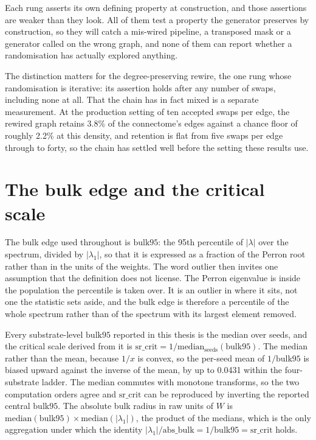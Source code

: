Each rung asserts its own defining property at construction, and those
assertions are weaker than they look. All of them test a property the generator
preserves by construction, %
so they will catch a mis-wired pipeline, a transposed mask or a generator called
on the wrong graph, and none of them can report whether a randomisation has
actually explored anything.

The distinction matters for the degree-preserving rewire, the one rung whose
randomisation is iterative: its assertion holds after any number of swaps,
including none at all. That the chain has in fact mixed is a separate
measurement. At the production setting of ten accepted swaps per edge, the
rewired graph retains 3.8\% %
of the connectome's edges against a chance floor of roughly
2.2\% %
at this density, and retention is flat from five swaps per edge through to
forty, %
so the chain has settled well before the setting these results use.



\section{The bulk edge and the critical scale}
\label{sec:methods-bulk95}
\bigskip

The bulk edge used throughout is $\mathrm{bulk95}$: the 95th percentile of
$|\lambda|$ over the spectrum, divided by $|\lambda_1|$, so that it is expressed
as a fraction of the Perron root rather than in the units of the
weights. %
The word outlier then invites one assumption that the definition does not
license. The Perron eigenvalue is inside the population the percentile is taken
over. %
It is an outlier in where it sits, not one the statistic sets aside, and the
bulk edge is therefore a percentile of the whole spectrum rather than of the
spectrum with its largest element removed.

Every substrate-level $\mathrm{bulk95}$ reported in this thesis is the median
over seeds, and the critical scale derived from it is
$\mathrm{sr\_crit} = 1 / \mathrm{median}_{\text{seeds}}(\mathrm{bulk95})$. %
The median rather than the mean, because $1/x$ is convex, so the per-seed mean
of $1/\mathrm{bulk95}$ is biased upward against the inverse of the mean, by up
to 0.0431 %
within the four-substrate ladder. The median commutes with monotone transforms,
so the two computation orders agree and $\mathrm{sr\_crit}$ can be reproduced by
inverting the reported central $\mathrm{bulk95}$. %
The absolute bulk radius in raw units of $W$ is
$\mathrm{median}(\mathrm{bulk95}) \times \mathrm{median}(|\lambda_1|)$, the
product of the medians, which is the only aggregation under which the identity
$|\lambda_1| / \mathrm{abs\_bulk} = 1/\mathrm{bulk95} = \mathrm{sr\_crit}$
holds. %





